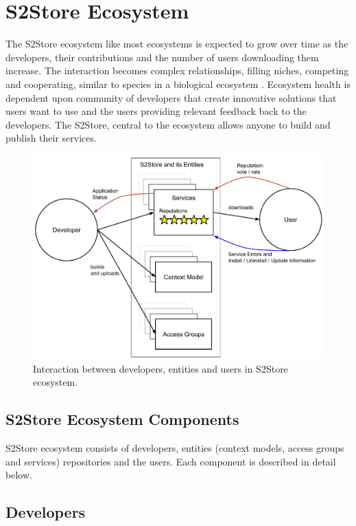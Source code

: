 \section{S2Store Ecosystem}
\label{sec:s2store_ecosystem}

The S2Store ecosystem like most ecosystems is expected to grow over time as the developers, their contributions and the number of users downloading them increase. The interaction becomes complex relationships, filling niches, competing and cooperating, similar to species in a biological ecosystem \cite{lim2012successful}. Ecosystem health is dependent upon community of developers that create innovative solutions that users want to use and the users providing relevant feedback back to the developers. The S2Store, central to the ecosystem allows anyone to build and publish their services. 

\begin{figure}[!htb]
  \centering
  \includegraphics[width=15cm]{figures/ecosystem.pdf}
  \caption{Interaction between developers, entities and users in S2Store ecosystem.}
  \label{fig:ecosystem}
\end{figure}

\subsection*{S2Store Ecosystem Components}

S2Store ecosystem consists of developers, entities (context models, access groups and services) repositories and the users. Each component is described in detail below.

\subsection{Developers}

